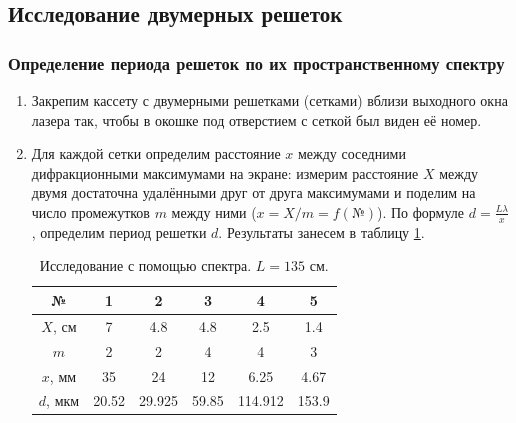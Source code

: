 \documentclass[a4paper, 12pt]{article}
\begin{document}
	\subsection{Исследование двумерных решеток}
	\subsubsection{Определение периода решеток по их пространственному спектру}
	\begin{enumerate}
		\item Закрепим кассету с двумерными решетками (сетками) вблизи выходного окна лазера так, чтобы в окошке под отверстием с сеткой был виден её номер.
		\item Для каждой сетки определим расстояние $x$ между соседними дифракционными максимумами на экране: измерим расстояние $X$ между двумя достаточна удалёнными друг от друга максимумами и поделим на число промежутков $m$ между ними ($x=X/m=f\left(\text{№}\right)$). По формуле $d=\frac{L\lambda}{x}$, определим период решетки $d$. Результаты занесем в таблицу \ref{tab:1}.
		\begin{table}[h]
			\centering
			\begin{tabular}{|c|c|c|c|c|c|}
				\hline
				№ & 1 & 2 &  3 & 4 & 5\\
				\hline
				$X$, см & 7 & 4.8 & 4.8 & 2.5 & 1.4\\
				$m$ & 2 & 2 & 4 & 4 & 3\\
				$x$, мм & 35 & 24 & 12 & 6.25 & 4.67\\
				$d$, мкм & 20.52 & 29.925 & 59.85 & 114.912 & 153.9\\
				\hline
			\end{tabular}
			\caption{Исследование с помощью спектра. $L=135$ см.}
			\label{tab:1}
		\end{table}
	\end{enumerate}
\end{document}

